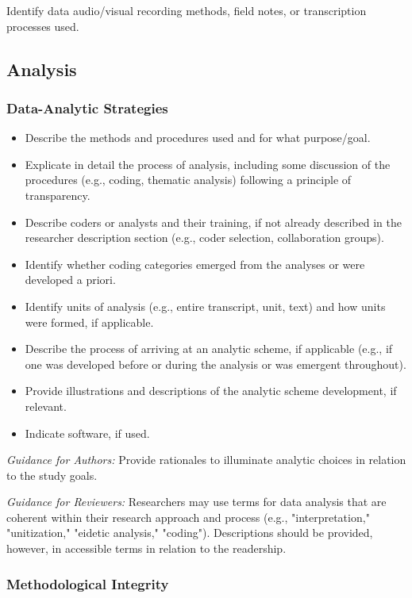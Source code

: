 \documentclass[acmsmall,screen,anonymous,review]{acmart}
\begin{document}
Identify data audio/visual recording methods, field notes, or transcription processes used.

\subsection{Analysis}

\subsubsection{Data-Analytic Strategies}

\begin{itemize}
    \item Describe the methods and procedures used and for what purpose/goal.
\item Explicate in detail the process of analysis, including some discussion of the procedures
(e.g., coding, thematic analysis) following a principle of transparency.
\item Describe coders or analysts and their training, if not already described in the researcher
description section (e.g., coder selection, collaboration groups).
\item Identify whether coding categories emerged from the analyses or were developed a priori.
\item Identify units of analysis (e.g., entire transcript, unit, text) and how units were formed,
if applicable.
\item Describe the process of arriving at an analytic scheme, if applicable (e.g., if one was
developed before or during the analysis or was emergent throughout).
\item Provide illustrations and descriptions of the analytic scheme development, if relevant.
\item Indicate software, if used.
\end{itemize}

\textit{Guidance for Authors:} Provide rationales to illuminate analytic choices in relation to the study goals.

\textit{Guidance for Reviewers:} Researchers may use terms for data analysis that are coherent within their research approach and process (e.g., "interpretation," "unitization," "eidetic analysis," "coding").
Descriptions should be provided, however, in accessible terms in relation to the readership.

\subsubsection{Methodological Integrity}
\end{document}
